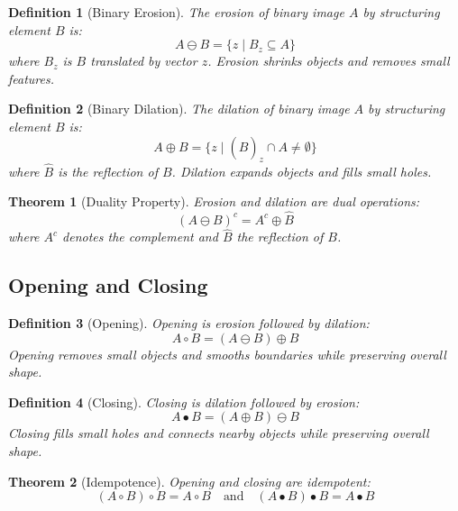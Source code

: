 \documentclass[a4paper, 11pt]{article}
\newtheorem{definition}{Definition}[section]
\newtheorem{theorem}{Theorem}[section]
\begin{document}
\begin{definition}[Binary Erosion]
The erosion of binary image $A$ by structuring element $B$ is:
\begin{equation}
A \ominus B = \{z \mid B_z \subseteq A\}
\end{equation}
where $B_z$ is $B$ translated by vector $z$. Erosion shrinks objects and removes small features.
\end{definition}

\begin{definition}[Binary Dilation]
The dilation of binary image $A$ by structuring element $B$ is:
\begin{equation}
A \oplus B = \{z \mid (\hat{B})_z \cap A \neq \emptyset\}
\end{equation}
where $\hat{B}$ is the reflection of $B$. Dilation expands objects and fills small holes.
\end{definition}

\begin{theorem}[Duality Property]
Erosion and dilation are dual operations:
\begin{equation}
(A \ominus B)^c = A^c \oplus \hat{B}
\end{equation}
where $A^c$ denotes the complement and $\hat{B}$ the reflection of $B$.
\end{theorem}

\subsection{Opening and Closing}

\begin{definition}[Opening]
Opening is erosion followed by dilation:
\begin{equation}
A \circ B = (A \ominus B) \oplus B
\end{equation}
Opening removes small objects and smooths boundaries while preserving overall shape.
\end{definition}

\begin{definition}[Closing]
Closing is dilation followed by erosion:
\begin{equation}
A \bullet B = (A \oplus B) \ominus B
\end{equation}
Closing fills small holes and connects nearby objects while preserving overall shape.
\end{definition}

\begin{theorem}[Idempotence]
Opening and closing are idempotent:
\begin{equation}
(A \circ B) \circ B = A \circ B \quad \text{and} \quad (A \bullet B) \bullet B = A \bullet B
\end{equation}
\end{theorem}
\end{document}
